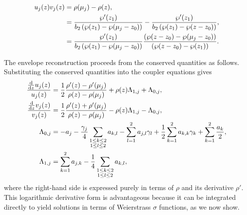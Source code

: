 \documentclass[11pt,a4paper]{article}
\begin{document}
\begin{align}
u_j{\left(z\right)} v_j{\left(z\right)} &= \rho(\mu_j) - \rho(z), \notag \\
&= \frac{\wp'{\left(z_{1}\right)}}{ b_2 \left(\wp{\left(z_{1}\right)} - \wp{\left({\mu}_{j} - z_{0}\right)}\right)} - \frac{\wp'{\left(z_{1}\right)}}{b_2 \left(\wp{\left(z_{1}\right)} - \wp{\left(z - z_{0}\right)}\right) }, \notag \\
&= \frac{\wp'{\left(z_{1}\right)} }{ b_2 \left(\wp{\left(z_{1}\right)} - \wp{\left({\mu}_{j}- z_{0}\right)}\right)} \frac{ \left(\wp{\left(z - z_{0}\right)} - \wp{\left({\mu}_{j} - z_{0}\right)}\right) }{ \left(\wp{\left(z - z_{0}\right)} - \wp{\left(z_{1}\right)}\right) }. \label{cc:eq:uv-wp}
\end{align}

The envelope reconstruction proceeds from the conserved quantities as follows.
Substituting the conserved quantities into the coupler equations gives
\begin{align}
\frac{\frac{\mathrm{d}}{\mathrm{d} z} u_j{\left(z\right)}}{u_j{\left(z\right)}} &= \frac{1}{2}\frac{\rho'{\left(z \right)} - \rho'{\left({\mu}_{j} \right)}}{\rho{\left(z \right)} - \rho{\left({\mu}_{j} \right)}} + \rho{\left(z \right)} {\Lambda}_{1,j} + {\Lambda}_{0,j}, \notag \\
\frac{\frac{\mathrm{d}}{\mathrm{d} z} v_j{\left(z\right)}}{v_j{\left(z\right)}} &= \frac{1}{2}\frac{\rho'{\left(z \right)} + \rho'{\left({\mu}_{j} \right)}}{\rho{\left(z \right)} - \rho{\left({\mu}_{j} \right)}} - \rho{\left(z \right)} {\Lambda}_{1,j} - {\Lambda}_{0,j}, \label{cc:eq:dlog-u-v-rho} \\
{\Lambda}_{0,j} &= - {a}_{j} - \frac{{\gamma}_{j}}{4}\sum_{\substack{1 \leq k \leq 2\\1 \leq l \leq 2}} {a}_{k,l} - \sum_{l=1}^{2} {a}_{j,l} {\gamma}_{l} + \frac{1}{2}\sum_{k=1}^{2} {a}_{k,k} {\gamma}_{k} + \sum_{k=1}^{2} \frac{{a}_{k}}{2}, \\
{\Lambda}_{1,j} &= \sum_{k=1}^{2} {a}_{j,k} - \frac{1}{4}\sum_{\substack{1 \leq k \leq 2\\1 \leq l \leq 2}}{a}_{k,l},
\end{align}
where the right-hand side is expressed purely in terms of $\rho$ and its derivative $\rho'$.
This logarithmic derivative form is advantageous because it can be integrated directly to yield solutions in terms of Weierstrass $\sigma$ functions, as we now show.
\end{document}
